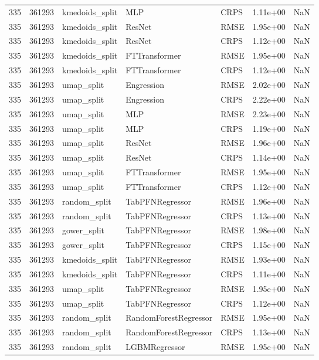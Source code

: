 \begin{tabular}{rrlllrr}
335 & 361293 & kmedoids\_split & MLP & CRPS & 1.11e+00 & NaN \\
335 & 361293 & kmedoids\_split & ResNet & RMSE & 1.95e+00 & NaN \\
335 & 361293 & kmedoids\_split & ResNet & CRPS & 1.12e+00 & NaN \\
335 & 361293 & kmedoids\_split & FTTransformer & RMSE & 1.95e+00 & NaN \\
335 & 361293 & kmedoids\_split & FTTransformer & CRPS & 1.12e+00 & NaN \\
335 & 361293 & umap\_split & Engression & RMSE & 2.02e+00 & NaN \\
335 & 361293 & umap\_split & Engression & CRPS & 2.22e+00 & NaN \\
335 & 361293 & umap\_split & MLP & RMSE & 2.23e+00 & NaN \\
335 & 361293 & umap\_split & MLP & CRPS & 1.19e+00 & NaN \\
335 & 361293 & umap\_split & ResNet & RMSE & 1.96e+00 & NaN \\
335 & 361293 & umap\_split & ResNet & CRPS & 1.14e+00 & NaN \\
335 & 361293 & umap\_split & FTTransformer & RMSE & 1.95e+00 & NaN \\
335 & 361293 & umap\_split & FTTransformer & CRPS & 1.12e+00 & NaN \\
335 & 361293 & random\_split & TabPFNRegressor & RMSE & 1.96e+00 & NaN \\
335 & 361293 & random\_split & TabPFNRegressor & CRPS & 1.13e+00 & NaN \\
335 & 361293 & gower\_split & TabPFNRegressor & RMSE & 1.98e+00 & NaN \\
335 & 361293 & gower\_split & TabPFNRegressor & CRPS & 1.15e+00 & NaN \\
335 & 361293 & kmedoids\_split & TabPFNRegressor & RMSE & 1.93e+00 & NaN \\
335 & 361293 & kmedoids\_split & TabPFNRegressor & CRPS & 1.11e+00 & NaN \\
335 & 361293 & umap\_split & TabPFNRegressor & RMSE & 1.95e+00 & NaN \\
335 & 361293 & umap\_split & TabPFNRegressor & CRPS & 1.12e+00 & NaN \\
335 & 361293 & random\_split & RandomForestRegressor & RMSE & 1.95e+00 & NaN \\
335 & 361293 & random\_split & RandomForestRegressor & CRPS & 1.13e+00 & NaN \\
335 & 361293 & random\_split & LGBMRegressor & RMSE & 1.95e+00 & NaN \\

\end{tabular}
